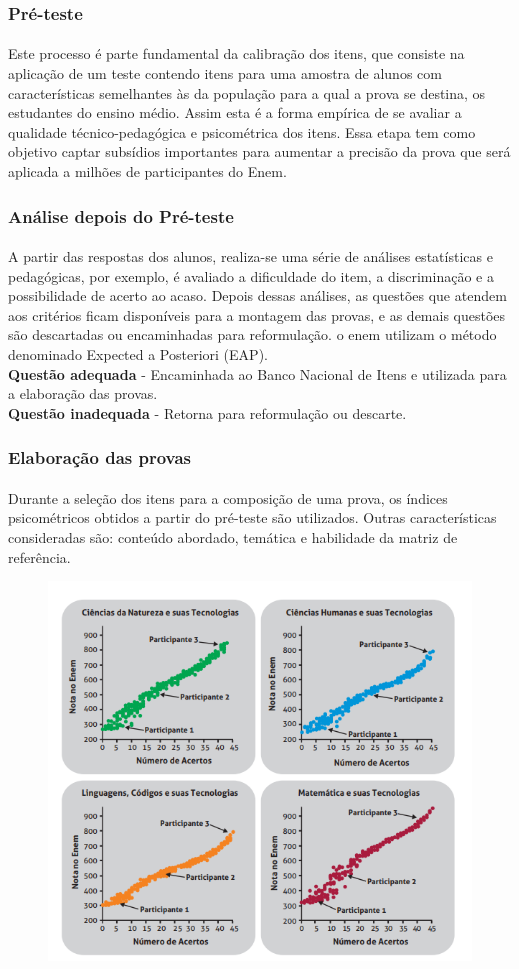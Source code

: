     \subsubsection{Pré-teste}
    \paragraph{}
    	Este processo é parte fundamental da calibração dos itens, que consiste na aplicação de um teste contendo itens para uma amostra de alunos com características semelhantes às da população para a qual a prova se destina, os estudantes do ensino médio. Assim esta é a forma empírica de se avaliar a qualidade técnico-pedagógica e psicométrica dos itens. Essa etapa tem como objetivo captar subsídios importantes para aumentar a precisão da prova que será aplicada a milhões de participantes do Enem.
    \subsubsection{Análise depois do Pré-teste}
    \paragraph{}
	    A partir das respostas dos alunos, realiza-se uma série de análises estatísticas e pedagógicas, por exemplo, é avaliado a dificuldade do item, a discriminação e a possibilidade de acerto ao acaso. Depois dessas análises, as questões que atendem aos critérios ficam disponíveis para a montagem das provas, e as demais questões são descartadas ou encaminhadas para reformulação. o enem utilizam o método denominado Expected a Posteriori (EAP).\\
	    \textbf{Questão adequada} - Encaminhada ao Banco Nacional de Itens e utilizada para a elaboração das provas.\\
	    \textbf{Questão inadequada} - Retorna para reformulação ou descarte.\\
	\subsubsection{Elaboração das provas}
	\paragraph{}
    	Durante a seleção dos itens para a composição de uma prova, os índices psicométricos obtidos a partir do pré-teste são utilizados. Outras características consideradas são: conteúdo abordado, temática e habilidade da matriz de referência.
    \newpage
	\begin{figure}[!h]
		\centering
		\includegraphics[width=0.4\linewidth]{img/acero}
		\caption{}
		\label{fig:acero}
	\end{figure}
